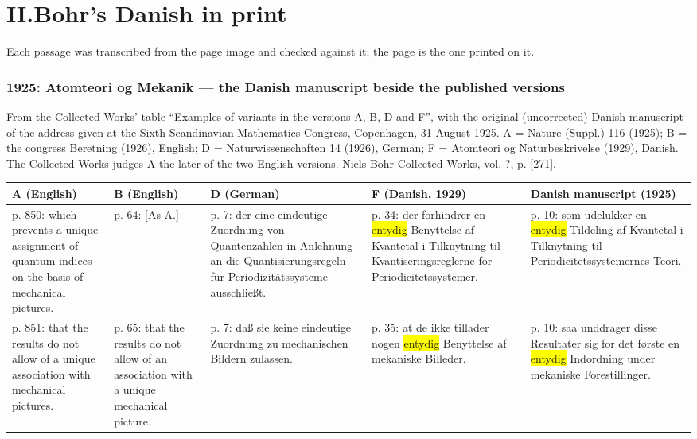 \documentclass[11pt]{article}
\newcommand{\tlg}[1]{{\setlength{\fboxsep}{0.8pt}\colorbox{yellow}{#1}}}
\newcommand{\olg}[1]{{\setlength{\fboxsep}{0.8pt}\colorbox{cyan!25}{#1}}}
\begin{document}
\part*{II.\quad Bohr's Danish in print}

\noindent Each passage was transcribed from the page image and checked against it; the page is the one printed on it.

\section{1925: Atomteori og Mekanik — the Danish manuscript beside the published versions}

\noindent From the Collected Works' table “Examples of variants in the versions A, B, D and F”, with the original (uncorrected) Danish manuscript of the address given at the Sixth Scandinavian Mathematics Congress, Copenhagen, 31 August 1925. A = Nature (Suppl.) 116 (1925); B = the congress Beretning (1926), English; D = Naturwissenschaften 14 (1926), German; F = Atomteori og Naturbeskrivelse (1929), Danish. The Collected Works judges A the later of the two English versions. Niels Bohr Collected Works, vol. ?, p. [271].

{\small\begin{longtable}{@{}>{\raggedright\arraybackslash}p{}>{\raggedright\arraybackslash}p{}>{\raggedright\arraybackslash}p{}>{\raggedright\arraybackslash}p{}>{\raggedright\arraybackslash}p{}@{}}\toprule
\textbf{A (English)} & \textbf{B (English)} & \textbf{D (German)} & \textbf{F (Danish, 1929)} & \textbf{Danish manuscript (1925)}\\\midrule
p. 850: which prevents a \olg{unique} assignment of quantum indices on the basis of mechanical pictures. & p. 64: [As A.] & p. 7: der eine \olg{eindeutige} Zuordnung von Quantenzahlen in Anlehnung an die Quantisierungsregeln für Periodizitätssysteme ausschließt. & p. 34: der forhindrer en \tlg{entydig} Benyttelse af Kvantetal i Tilknytning til Kvantiseringsreglerne for Periodicitetssystemer. & p. 10: som udelukker en \tlg{entydig} Tildeling af Kvantetal i Tilknytning til Periodicitetssystemernes Teori.\\[1ex]
p. 851: that the results do not allow of a \olg{unique} association with mechanical pictures. & p. 65: that the results do not allow of an association with a \olg{unique} mechanical picture. & p. 7: daß sie keine \olg{eindeutige} Zuordnung zu mechanischen Bildern zulassen. & p. 35: at de ikke tillader nogen \tlg{entydig} Benyttelse af mekaniske Billeder. & p. 10: saa unddrager disse Resultater sig for det første en \tlg{entydig} Indordning under mekaniske Forestillinger.\\[1ex]
\bottomrule\end{longtable}}
\end{document}
